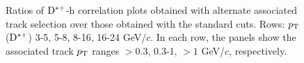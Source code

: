\begin{figure}
 \caption{Ratios of ${\rm D^{*+}}$-h correlation plots obtained with alternate associated track selection over those obtained with the standard cuts. Rows: $p_{\rm T}$(${\rm D^{*+}}$) 3-5, 5-8, 8-16, 16-24 GeV/$c$. In each row, the panels show the associated track
$p_{\rm T}$ ranges $> 0.3$, 0.3-1, $> 1$ GeV/$c$, respectively.}
\label{fig:SysTrEff_Dstar}
\end{figure}


